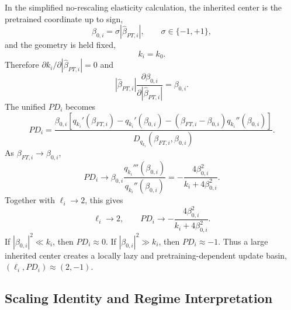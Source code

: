 \documentclass[11pt]{article}
\begin{document}
In the simplified no-rescaling elasticity calculation, the inherited center is the pretrained coordinate up to sign,
\begin{equation}
    \beta_{0,i}=\sigma|\widehat\beta_{PT,i}|,
    \qquad
    \sigma\in\{-1,+1\},
\end{equation}
and the geometry is held fixed,
\begin{equation}
    k_i=k_0.
\end{equation}
Therefore \(\partial k_i/\partial|\widehat\beta_{PT,i}|=0\) and
\begin{equation}
    |\widehat\beta_{PT,i}|
    \frac{\partial\beta_{0,i}}{\partial |\widehat\beta_{PT,i}|}
    =
    \beta_{0,i}.
\end{equation}
The unified \(PD_i\) becomes
\begin{equation}
    \boxed{
    PD_i
    =
    \frac{
    \beta_{0,i}
    \left[
    q_{k_i}'(\beta_{FT,i})-q_{k_i}'(\beta_{0,i})
    -
    (\beta_{FT,i}-\beta_{0,i})q_{k_i}''(\beta_{0,i})
    \right]
    }{
    D_{q_{k_i}}(\beta_{FT,i},\beta_{0,i})
    }
    }.
\end{equation}
As \(\beta_{FT,i}\to\beta_{0,i}\),
\begin{equation}
    PD_i
    \to
    \beta_{0,i}\frac{q_{k_i}'''(\beta_{0,i})}{q_{k_i}''(\beta_{0,i})}
    =
    -\frac{4\beta_{0,i}^2}{k_i+4\beta_{0,i}^2}.
\end{equation}
Together with \(\ell_i\to2\), this gives
\begin{equation}
    \boxed{
    \ell_i\to2,
    \qquad
    PD_i\to-\frac{4\beta_{0,i}^2}{k_i+4\beta_{0,i}^2}.
    }
\end{equation}
If \(|\beta_{0,i}|^2\ll k_i\), then \(PD_i\approx0\). If \(|\beta_{0,i}|^2\gg k_i\), then \(PD_i\approx-1\). Thus a large inherited center creates a locally lazy and pretraining-dependent update basin, \((\ell_i,PD_i)\approx(2,-1)\).

\subsection{Scaling Identity and Regime Interpretation}
\end{document}
